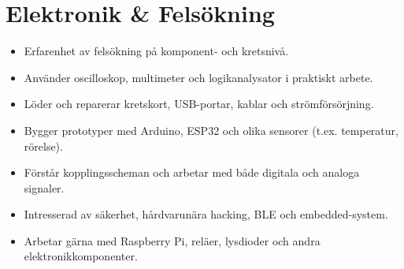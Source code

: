\section*{Elektronik \& Felsökning}
\begin{itemize}
  \item Erfarenhet av felsökning på komponent- och kretsnivå.
  \item Använder oscilloskop, multimeter och logikanalysator i praktiskt arbete.
  \item Löder och reparerar kretskort, USB-portar, kablar och strömförsörjning.
  \item Bygger prototyper med Arduino, ESP32 och olika sensorer (t.ex. temperatur, rörelse).
  \item Förstår kopplingsscheman och arbetar med både digitala och analoga signaler.
  \item Intresserad av säkerhet, hårdvarunära hacking, BLE och embedded-system.
  \item Arbetar gärna med Raspberry Pi, reläer, lysdioder och andra elektronikkomponenter.
\end{itemize}
